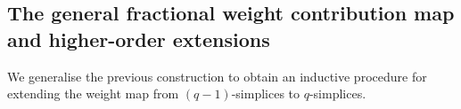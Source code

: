 \documentclass[12pt]{article}
\theoremstyle{normalhead_nobrackets}
\theoremstyle{exampstyle}
\newtheorem{example}{Example}[section]
\begin{document}

\subsection{The general fractional weight contribution map and higher-order extensions}
We generalise the previous construction to obtain an inductive procedure for extending the weight map from $(q-1)$-simplices to $q$-simplices.
\end{document}
